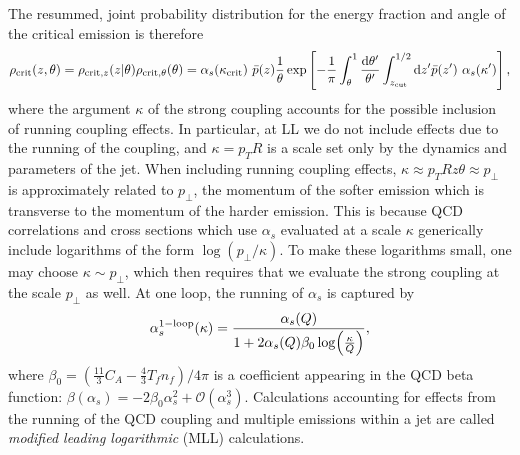 The resummed, joint probability distribution for the energy fraction and angle of the critical emission is therefore
%
\begin{equation}
    \rho_{\rm crit}(z,\theta)
    =
    \rho_{{\rm crit}, z}(z | \theta)
    \rho_{{\rm crit}, \theta}(\theta)
    =
    \alpha_s(\kappa_{\rm crit})
    ~
    \bar{p}(z)
    \frac{1}{\theta}
    \exp\left[
    - \frac{1}{\pi}
    \int_{\theta}^1
    \frac{\dd\theta'}{\theta'}
    \int_{z_{\rm cut}}^{1/2} \dd z'
    \bar{p}(z')~
    \alpha_s(\kappa')
    \right]
    ,
\end{equation}
where the argument \(\kappa\) of the strong coupling accounts for the possible inclusion of running coupling effects.
%
In particular, at LL we do not include effects due to the running of the coupling, and \(\kappa = p_T R\) is a scale set only by the dynamics and parameters of the jet.
%
When including running coupling effects, \(\kappa \approx p_T R z \theta \approx p_\perp\) is approximately related to \(p_\perp\), the momentum of the softer emission which is transverse to the momentum of the harder emission.
%
This is because QCD correlations and cross sections which use \(\alpha_s\) evaluated at a scale \(\kappa\) generically include logarithms of the form \(\log(p_{\perp} / \kappa)\).
%
To make these logarithms small, one may choose \(\kappa \sim p_\perp\), which then requires that we evaluate the strong coupling at the scale \(p_\perp\) as well.
%
At one loop, the running of \(\alpha_s\) is captured by
\begin{align}
    \alpha^{\rm 1-loop}_s(\kappa)
    =
    \frac{\alpha_s(Q)}{1 + 2\alpha_s(Q) \beta_0 \log(\frac{\kappa}{Q})}
    ,
\end{align}
where \(\beta_0 = (\frac{11}{3}C_A - \frac{4}{3} T_f n_f)/4\pi\) is a coefficient appearing in the QCD beta function: \(\beta(\alpha_s) = -2\beta_0 \alpha_s^2 + \mathcal{O}(\alpha_s^3)\).
%
Calculations accounting for effects from the running of the QCD coupling and multiple emissions within a jet are called \textit{modified leading logarithmic} (MLL) calculations.


